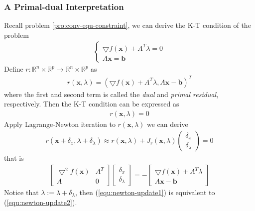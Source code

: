 \subsubsection{A Primal-dual Interpretation}
Recall problem \ref{pro:conv-equ-constraint},
we can derive the K-T condition of the problem
\begin{align}
    \left\{
        \begin{array}{ll}
            \bigtriangledown f(\mathbf{x}) + A^T \lambda = 0 \\
             A\mathbf{x} = \mathbf{b}
        \end{array}\right.
        \label{equ:conv-equ-kt1}
\end{align}
Define $r: \mathbb{R}^n \times \mathbb{R}^p \rightarrow \mathbb{R}^n \times \mathbb{R}^p$ as
\begin{align}
    r(\mathbf{x}, \lambda) = (\bigtriangledown f(\mathbf{x}) + A^T \lambda, A\mathbf{x} - \mathbf{b})^T
\end{align}
where the first and second term is called the \emph{dual} and \emph{primal residual},
respectively. Then the K-T condition can be expressed as
\begin{align}
    r(\mathbf{x}, \lambda) = 0
\end{align}
Apply Lagrange-Newton iteration to $r(\mathbf{x}, \lambda)$ we can derive
\begin{align}
    r(\mathbf{x} + \delta_x, \lambda + \delta_\lambda) \approx
    r(\mathbf{x}, \lambda) + J_r(\mathbf{x}, \lambda)
    \begin{pmatrix}
        \delta_x \\
        \delta_\lambda
    \end{pmatrix} = 0
\end{align}
that is
\begin{align}
    \begin{bmatrix}
        \bigtriangledown^2 f(\mathbf{x}) &A^T \\
        A & 0
    \end{bmatrix}
    \begin{bmatrix}
        \delta_x \\
        \delta_\lambda
    \end{bmatrix} = -
    \begin{bmatrix}
        \bigtriangledown f(\mathbf{x}) + A^T \lambda \\
        A\mathbf{x} - \mathbf{b}
    \end{bmatrix}
    \label{equ:newton-update2}
\end{align}
Notice that $\lambda := \lambda + \delta_\lambda$, then
(\ref{equ:newton-update1}) is equivalent to (\ref{equ:newton-update2}).

